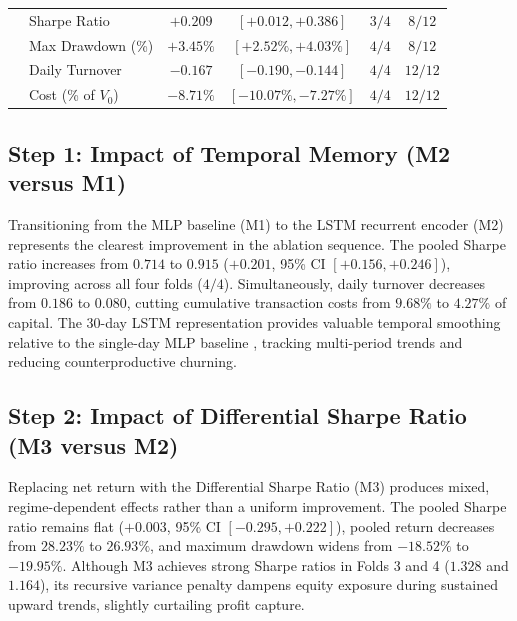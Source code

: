 \begin{table}[htbp]
\begin{tabular}{@{}llcccc@{}}
\midrule
{} 
& Sharpe Ratio & $+0.209$ & $[+0.012, +0.386]$ & $3 / 4$ & $8 / 12$ \\
& Max Drawdown (\%) & $+3.45\%$ & $[+2.52\%, +4.03\%]$ & $4 / 4$ & $8 / 12$ \\
& Daily Turnover & $-0.167$ & $[-0.190, -0.144]$ & $4 / 4$ & $12 / 12$ \\
& Cost (\% of $V_0$) & $-8.71\%$ & $[-10.07\%, -7.27\%]$ & $4 / 4$ & $12 / 12$ \\
\bottomrule
\end{tabular}
\end{table}

\subsection{Step 1: Impact of Temporal Memory (M2 versus M1)}
Transitioning from the MLP baseline (M1) to the LSTM recurrent encoder (M2) represents the clearest improvement in the ablation sequence. The pooled Sharpe ratio increases from $0.714$ to $0.915$ ($+0.201$, 95\% CI $[+0.156, +0.246]$), improving across all four folds ($4/4$). Simultaneously, daily turnover decreases from $0.186$ to $0.080$, cutting cumulative transaction costs from $9.68\%$ to $4.27\%$ of capital. The 30-day LSTM representation provides valuable temporal smoothing relative to the single-day MLP baseline \citep{zou2024novel}, tracking multi-period trends and reducing counterproductive churning.

\subsection{Step 2: Impact of Differential Sharpe Ratio (M3 versus M2)}
Replacing net return with the Differential Sharpe Ratio (M3) produces mixed, regime-dependent effects rather than a uniform improvement. The pooled Sharpe ratio remains flat ($+0.003$, 95\% CI $[-0.295, +0.222]$), pooled return decreases from $28.23\%$ to $26.93\%$, and maximum drawdown widens from $-18.52\%$ to $-19.95\%$. Although M3 achieves strong Sharpe ratios in Folds 3 and 4 ($1.328$ and $1.164$), its recursive variance penalty \citep{millea2021deep} dampens equity exposure during sustained upward trends, slightly curtailing profit capture.

